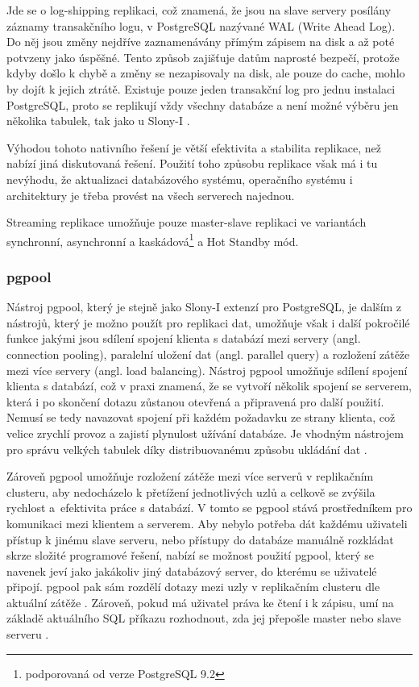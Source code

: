   Jde se o log-shipping replikaci, což znamená, že jsou na slave servery
  posílány záznamy transakčního logu, v PostgreSQL nazývané WAL (Write Ahead
  Log). Do něj jsou změny nejdříve zaznamenávány přímým zápisem na disk a až
  poté potvzeny jako úspěšné. Tento způsob zajišťuje datům naprosté bezpečí,
  protože kdyby došlo k chybě a změny se nezapisovaly na disk, ale pouze do
  cache, mohlo by dojít k jejich ztrátě. Existuje pouze jeden transakční log
  pro jednu instalaci PostgreSQL, proto se replikují vždy všechny databáze a
  není možné výběru jen několika tabulek, tak jako u Slony-I \citep{Boszormenyi2013}. 
 
  Výhodou tohoto nativního řešení je větší efektivita a stabilita replikace,
  než nabízí jiná diskutovaná řešení. Použití toho způsobu replikace však má i
  tu nevýhodu, že aktualizaci databázového systému, operačního systému i
  architektury je třeba provést na všech serverech najednou.

  Streaming replikace umožňuje pouze master-slave replikaci ve variantách
  synchronní, asynchronní a kaskádová\footnote{podporovaná od verze PostgreSQL 9.2} a Hot Standby mód.

      \subsubsection{pgpool}
      \label{kpgpool}

      Nástroj pgpool, který je stejně jako Slony-I extenzí pro PostgreSQL, je dalším z nástrojů, který je možno použít pro replikaci dat, umožňuje však i další pokročilé funkce jakými jsou sdílení spojení klienta s databází mezi servery (angl. connection pooling), paralelní uložení dat (angl. parallel query) a rozložení zátěže mezi více servery (angl. load balancing). 
Nástroj pgpool umožňuje sdílení spojení klienta s databází, což v praxi znamená, že se vytvoří několik spojení se serverem, která i po skončení dotazu zůstanou otevřená a připravená pro další použití. Nemusí se tedy navazovat spojení při každém požadavku ze strany klienta, což velice zrychlí provoz a zajistí plynulost užívání databáze. Je vhodným nástrojem pro správu velkých tabulek díky distribuovanému způsobu ukládání dat \citep{pgpool2014}. 

Zároveň pgpool umožňuje rozložení zátěže mezi více serverů v replikačním clusteru, aby nedocházelo k přetížení jednotlivých uzlů a celkově se zvýšila rychlost a~efektivita práce s databází. V tomto se pgpool stává prostředníkem pro komunikaci mezi klientem a serverem. Aby nebylo potřeba dát každému uživateli přístup k jinému slave serveru, nebo přístupy do databáze manuálně rozkládat skrze složité programové řešení, nabízí se možnost použití pgpool, který se navenek jeví jako jakákoliv jiný databázový server, do kterému se uživatelé připojí. pgpool pak sám rozdělí dotazy mezi uzly v replikačním clusteru dle aktuální zátěže \citep{Boszormenyi2013}. Zároveň, pokud má uživatel práva ke čtení i k zápisu, umí na základě aktuálního SQL příkazu rozhodnout, zda jej přepošle master nebo slave serveru . 

